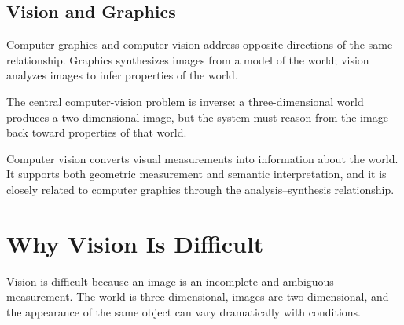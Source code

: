 \documentclass[11pt,a4paper,oneside]{report}
\begin{document}
\section{Vision and Graphics}

Computer graphics and computer vision address opposite directions of the same relationship. Graphics synthesizes images from a model of the world; vision analyzes images to infer properties of the world.

\begin{keyconcept}
\centering
{}
\par\vspace{0.35em}
\RaggedRight The central computer-vision problem is inverse: a three-dimensional world produces a two-dimensional image, but the system must reason from the image back toward properties of that world.
\end{keyconcept}

\FloatBarrier
\begin{chaptersummary}
Computer vision converts visual measurements into information about the world. It supports both geometric measurement and semantic interpretation, and it is closely related to computer graphics through the analysis--synthesis relationship.
\end{chaptersummary}

\chapter{Why Vision Is Difficult}

Vision is difficult because an image is an incomplete and ambiguous measurement. The world is three-dimensional, images are two-dimensional, and the appearance of the same object can vary dramatically with conditions.
\end{document}
